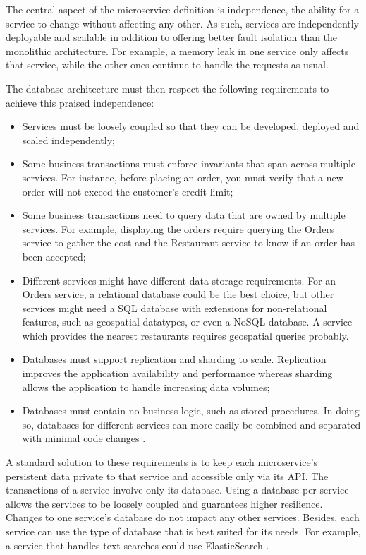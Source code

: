 \documentclass[conference]{IEEEtran}
\begin{document}
The central aspect of the microservice definition is independence, the ability for a service to change without affecting any other. As such, services are independently deployable and scalable in addition to offering better fault isolation than the monolithic architecture. For example, a memory leak in one service only affects that service, while the other ones continue to handle the requests as usual.

The database architecture must then respect the following requirements to achieve this praised independence:

\begin{itemize}
  \item Services must be loosely coupled so that they can be developed, deployed and scaled independently;
  \item Some business transactions must enforce invariants that span across multiple services. For instance, before placing an order, you must verify that a new order will not exceed the customer's credit limit;
  \item Some business transactions need to query data that are owned by multiple services. For example, displaying the orders require querying the Orders service to gather the cost and the Restaurant service to know if an order has been accepted;
  \item Different services might have different data storage requirements. For an Orders service, a relational database could be the best choice, but other services might need a SQL database with extensions for non-relational features, such as geospatial datatypes, or even a NoSQL database. A service which provides the nearest restaurants requires geospatial queries probably.
  \item Databases must support replication and sharding to scale. Replication improves the application availability and performance whereas sharding allows the application to handle increasing data volumes;
  \item Databases must contain no business logic, such as stored procedures. In doing so, databases for different services can more easily be combined and separated with minimal code changes \cite{ebay-architecture}.
\end{itemize}

A standard solution to these requirements is to keep each microservice's persistent data private to that service and accessible only via its API. The transactions of a service involve only its database. 
Using a database per service allows the services to be loosely coupled and guarantees higher resilience. Changes to one service's database do not impact any other services. Besides, each service can use the type of database that is best suited for its needs. For example, a service that handles text searches could use ElasticSearch \cite{database-per-service}.
\end{document}
